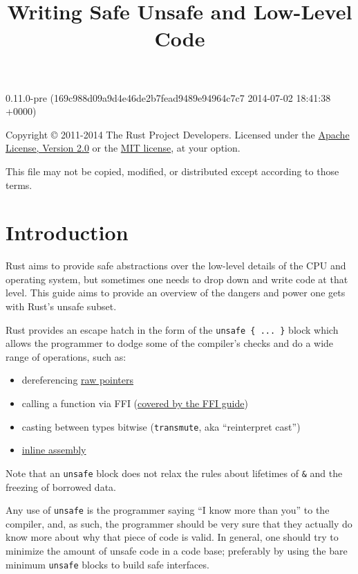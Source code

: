 \documentclass[]{article}
\title{Writing Safe Unsafe and Low-Level Code}
\begin{document}
\maketitle

0.11.0-pre (169c988d09a9d4e46de2b7fead9489e94964c7c7 2014-07-02 18:41:38 +0000)

Copyright © 2011-2014 The Rust Project Developers. Licensed under the
\href{http://www.apache.org/licenses/LICENSE-2.0}{Apache License,
Version 2.0} or the \href{http://opensource.org/licenses/MIT}{MIT
license}, at your option.

This file may not be copied, modified, or distributed except according
to those terms.

{
\hypersetup{linkcolor=black}
\setcounter{tocdepth}{3}
\tableofcontents
}
\section{Introduction}\label{introduction}

Rust aims to provide safe abstractions over the low-level details of the
CPU and operating system, but sometimes one needs to drop down and write
code at that level. This guide aims to provide an overview of the
dangers and power one gets with Rust's unsafe subset.

Rust provides an escape hatch in the form of the
\texttt{unsafe \{ ... \}} block which allows the programmer to dodge
some of the compiler's checks and do a wide range of operations, such
as:

\begin{itemize}
\itemsep1pt\parskip0pt
\item
  dereferencing \hyperref[raw-pointers]{raw pointers}
\item
  calling a function via FFI (\href{guide-ffi.html}{covered by the FFI
  guide})
\item
  casting between types bitwise (\texttt{transmute}, aka ``reinterpret
  cast'')
\item
  \hyperref[inline-assembly]{inline assembly}
\end{itemize}

Note that an \texttt{unsafe} block does not relax the rules about
lifetimes of \texttt{\&} and the freezing of borrowed data.

Any use of \texttt{unsafe} is the programmer saying ``I know more than
you'' to the compiler, and, as such, the programmer should be very sure
that they actually do know more about why that piece of code is valid.
In general, one should try to minimize the amount of unsafe code in a
code base; preferably by using the bare minimum \texttt{unsafe} blocks
to build safe interfaces.
\end{document}
